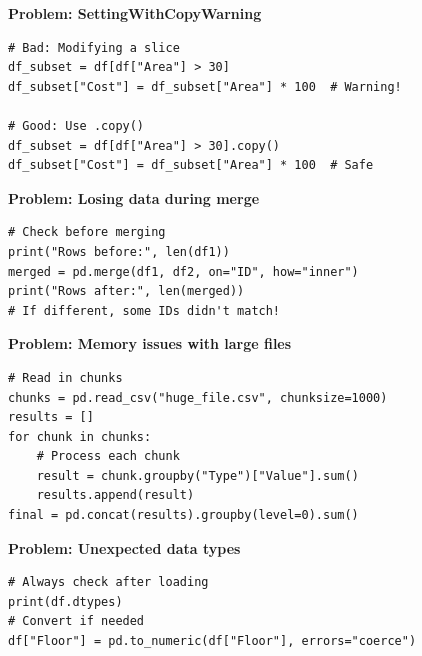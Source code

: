 
\begin{tcolorbox}[
    title=Avoiding Common Mistakes,
    colframe=blue,
    colback=white,
    arc=2mm
]
\textbf{Problem: SettingWithCopyWarning}
\begin{verbatim}
# Bad: Modifying a slice
df_subset = df[df["Area"] > 30]
df_subset["Cost"] = df_subset["Area"] * 100  # Warning!

# Good: Use .copy()
df_subset = df[df["Area"] > 30].copy()
df_subset["Cost"] = df_subset["Area"] * 100  # Safe
\end{verbatim}

\textbf{Problem: Losing data during merge}
\begin{verbatim}
# Check before merging
print("Rows before:", len(df1))
merged = pd.merge(df1, df2, on="ID", how="inner")
print("Rows after:", len(merged))
# If different, some IDs didn't match!
\end{verbatim}

\textbf{Problem: Memory issues with large files}
\begin{verbatim}
# Read in chunks
chunks = pd.read_csv("huge_file.csv", chunksize=1000)
results = []
for chunk in chunks:
    # Process each chunk
    result = chunk.groupby("Type")["Value"].sum()
    results.append(result)
final = pd.concat(results).groupby(level=0).sum()
\end{verbatim}

\textbf{Problem: Unexpected data types}
\begin{verbatim}
# Always check after loading
print(df.dtypes)
# Convert if needed
df["Floor"] = pd.to_numeric(df["Floor"], errors="coerce")
\end{verbatim}
\end{tcolorbox}



